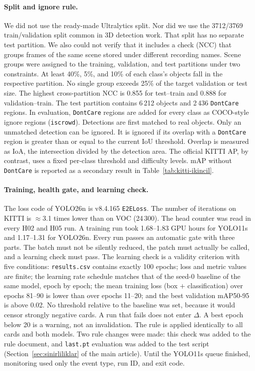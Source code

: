 \paragraph{Split and ignore rule.}
We did not use the ready-made Ultralytics split. Nor did we use the 3712/3769 train/validation split common in 3D detection work. That split has no separate test partition. We also could not verify that it includes a check (NCC) that groups frames of the same scene stored under different recording names. Scene groups were assigned to the training, validation, and test partitions under two constraints. At least 40\%, 5\%, and 10\% of each class's objects fall in the respective partition. No single group exceeds 25\% of the target validation or test size. The highest cross-partition NCC is 0.855 for test--train and 0.888 for validation--train. The test partition contains 6\,212 objects and 2\,436 \texttt{DontCare} regions. In evaluation, \texttt{DontCare} regions are added for every class as COCO-style ignore regions (\texttt{iscrowd}). Detections are first matched to real objects. Only an unmatched detection can be ignored. It is ignored if its overlap with a \texttt{DontCare} region is greater than or equal to the current IoU threshold. Overlap is measured as IoA, the intersection divided by the detection area. The official KITTI AP, by contrast, uses a fixed per-class threshold and difficulty levels. mAP without \texttt{DontCare} is reported as a secondary result in Table~\ref{tab:kitti-ikincil}.

\paragraph{Training, health gate, and learning check.}
The loss code of YOLO26n is v8.4.165 \texttt{E2ELoss}. The number of iterations on KITTI is $\approx$3.1 times lower than on VOC (24\,300). The head counter was read in every H02 and H05 run. A training run took 1.68--1.83 GPU hours for YOLO11s and 1.17--1.31 for YOLO26n. Every run passes an automatic gate with three parts. The batch must not be silently reduced, the patch must actually be called, and a learning check must pass. The learning check is a validity criterion with five conditions:
\texttt{results.csv} contains exactly 100 epochs;
loss and metric values are finite;
the learning rate schedule matches that of the seed-0 baseline of the same model, epoch by epoch;
the mean training loss (box $+$ classification) over epochs 81--90 is lower than over epochs 11--20;
and the best validation mAP50-95 is above 0.02.
No threshold relative to the baseline was set, because it would censor strongly negative cards. A run that fails does not enter $\Delta$. A best epoch below 20 is a warning, not an invalidation. The rule is applied identically to all cards and both models. Two rule changes were made: this check was added to the rule document, and \texttt{last.pt} evaluation was added to the test script (Section~\ref{sec:sinirliliklar} of the main article). Until the YOLO11s queue finished, monitoring used only the event type, run ID, and exit code.

